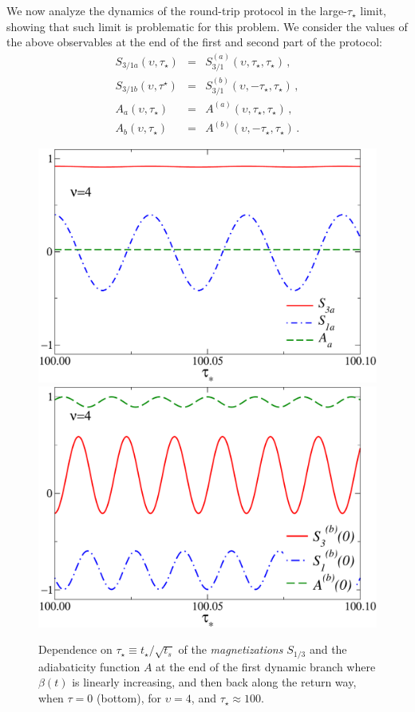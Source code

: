 We now analyze the dynamics of the round-trip protocol in the
large-$\tau_\star$ limit, showing that such limit is problematic for
this problem.  We consider the values of the above observables at the
end of the first and second part of the protocol:
\begin{eqnarray}
 S_{3/1a}(\upsilon,\tau_\star) &=&
  S_{3/1}^{(a)}(\upsilon,\tau_\star,\tau_\star)\,,\label{suddef}\\
  S_{3/1b}(\upsilon,\tau^\star) &=&
  S_{3/1}^{(b)}(\upsilon,-\tau_\star,\tau_\star)\,,\nonumber\\
  A_{a}(\upsilon,\tau_\star)
  &=& A^{(a)}(\upsilon,\tau_\star,\tau_\star)\,,\nonumber\\
 A_{b}(\upsilon,\tau_\star) &=&
  A^{(b)}(\upsilon,-\tau_\star,\tau_\star)\,.\nonumber
\end{eqnarray}

\begin{figure}[!htb]
  \centering
  \includegraphics[width=0.55\columnwidth]{imm/oscillation2a.pdf}
  \includegraphics[width=0.55\columnwidth]{imm/oscillation2b.pdf}
  \caption{Dependence on $\tau_\star\equiv t_\star/\sqrt{t_s}$ of the
    {\em magnetizations} $S_{1/3}$ and the adiabaticity function $A$
    at the end of the first dynamic branch where $\beta(t)$
    is linearly increasing, and then back along the return way, when
    $\tau=0$ (bottom), for $\upsilon=4$, and $\tau_\star\approx 100$.}
  \label{lzfigs2}
\end{figure}

